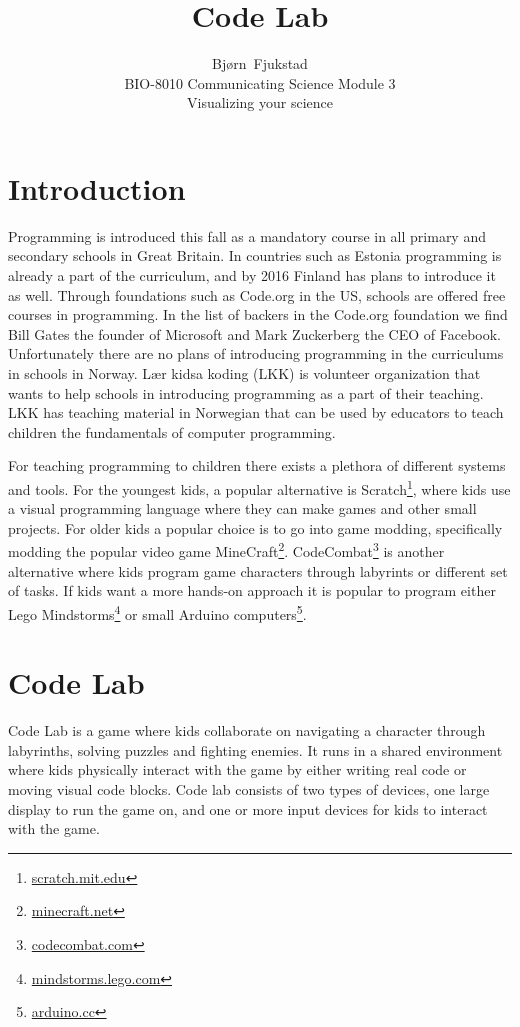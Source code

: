 \documentclass[11pt,journal,compsoc]{IEEEtran}
\begin{document}
\title{Code Lab}
\author{Bjørn~Fjukstad \\ BIO-8010 Communicating Science Module 3\\ Visualizing
your science} 
\maketitle
\vspace{-15mm}

\section{Introduction} 
Programming is introduced this fall as a mandatory course in all primary and
secondary schools in Great Britain. In countries such as Estonia programming is
already a part of the curriculum, and by 2016 Finland has plans to introduce it
as well. Through foundations such as Code.org in the US, schools are offered
free courses in programming. In the list of backers in the Code.org foundation
we find Bill Gates the founder of Microsoft and Mark Zuckerberg the CEO of
Facebook. Unfortunately there are no plans of introducing programming in the
curriculums in schools in Norway. Lær kidsa koding (LKK) is volunteer
organization that wants to help schools in introducing programming as a part of
their teaching. LKK has teaching material in Norwegian that can be used by
educators to teach children the fundamentals of computer programming. 

For teaching programming to children there exists a plethora of different
systems and tools. For the youngest kids, a popular alternative is
Scratch\footnote{\url{scratch.mit.edu}}, where kids use a visual programming
language where they can make games and other small projects.  For older kids a
popular choice is to go into game modding, specifically modding the popular
video game MineCraft\footnote{\url{minecraft.net}}.
CodeCombat\footnote{\url{codecombat.com}} is another alternative where kids
program game characters through labyrints or different set of tasks. If kids
want a more hands-on approach it is popular to program either Lego
Mindstorms\footnote{\url{mindstorms.lego.com}} or small Arduino
computers\footnote{\url{arduino.cc}}. 

\section{Code Lab}
Code Lab is a game where kids collaborate on navigating a character 
through labyrinths, solving puzzles and fighting enemies. It runs in a shared
environment where kids physically interact with the game by either writing
real code or moving visual code blocks. Code lab consists of two types of 
devices, one large display to run the game on, and one or more input devices for
kids to interact with the game. 
\end{document}
